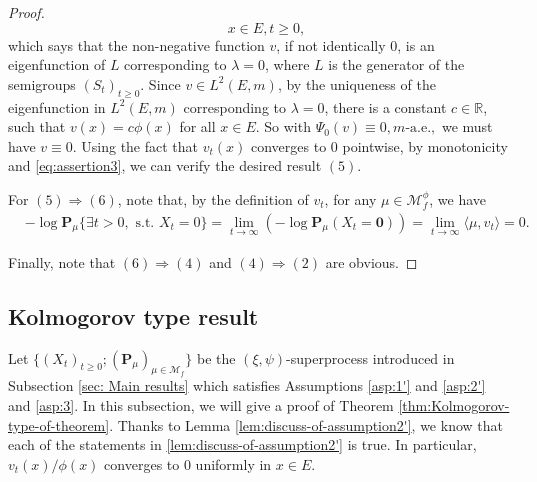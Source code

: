 \documentclass[UTF8]{pkuthss}
\theoremstyle{plain}
\theoremstyle{definition}
\numberwithin{equation}{section}
\begin{document}
\begin{proof}
\[	\quad x\in E, t\geq 0,
\]
which says that the non-negative function $v$, if not identically 0,  is an eigenfunction  of $L$  corresponding to $\lambda=0$, where $L$ is the generator of the semigroups $(S_t)_{t \geq 0}$.
	Since $v\in L^2(E,m)$, by the uniqueness of the eigenfunction   in  $L^2(E,m)$ corresponding to $\lambda=0$,
there is a constant $c\in \mathbb R$, such that $v(x) = c\phi(x)$ for all $x\in E$.
	So with $\Psi_0 (v) \equiv 0, m\text{-a.e.},$ we must have $v\equiv 0$.
	Using the fact that $v_t(x)$ converges to $0$ pointwise, by monotonicity and \eqref{eq:assertion3}, we can verify the desired result $(5)$.
\par
	For $(5)\Rightarrow (6)$, note that,
by the definition of $v_t$,
	for any $\mu\in\mathcal M_f^\phi$, we have
\begin{align}
	&-\log\mathbf P_\mu\{\exists t>0,\text{ s.t. }X_t=0\}
	=\lim_{t\to \infty}(-\log\mathbf P_\mu(X_t = \mathbf 0))
	=\lim_{t\to\infty}\langle\mu, v_t\rangle
	= 0.
\end{align}
\par
	Finally, note that $(6)\Rightarrow (4)$ and $(4)\Rightarrow (2)$ are obvious.
\end{proof}

\subsection{Kolmogorov type result}
	Let $\{(X_t)_{t\geq 0}; (\mathbf P_\mu)_{\mu \in \mathcal M_f}\}$ be the $(\xi,\psi)$-superprocess introduced in Subsection \ref{sec: Main results} which satisfies Assumptions \ref{asp:1'} and \ref{asp:2'} and \ref{asp:3}.
	In this subsection, we will give a proof of Theorem \ref{thm:Kolmogorov-type-of-theorem}. Thanks to Lemma \ref{lem:discuss-of-assumption2'}, we know that each of the statements in \ref{lem:discuss-of-assumption2'} is true.
	In particular, $v_t(x)/\phi(x)$ converges to $0$ uniformly in $x\in E$.
\end{document}
